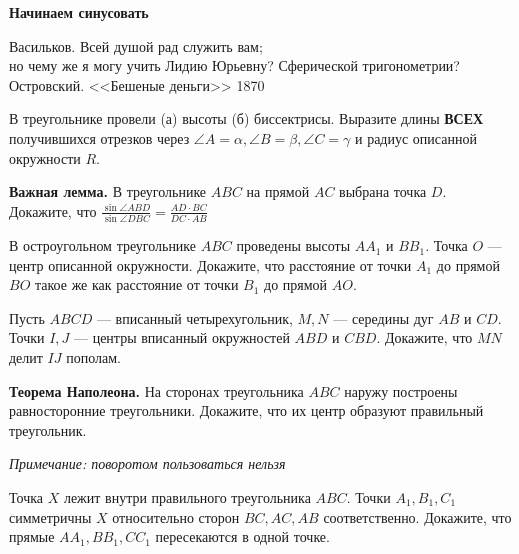 \centerline{\Huge \bf Начинаем синусовать}
\centerline{\Huge \bf }

\begin{flushright}
        \scriptsize{Васильков. Всей душой рад служить вам;\\ но чему же я могу учить Лидию Юрьевну? Сферической тригонометрии?\\Островский. <<Бешеные деньги>> 1870}
\end{flushright}


 В треугольнике провели (а) высоты (б) биссектрисы. Выразите длины \textbf{ВСЕХ} получившихся отрезков через $\angle A = \alpha, \angle B = \beta, \angle C = \gamma$ и радиус описанной окружности $R$.

 \textbf{Важная лемма.} В треугольнике $ABC$ на прямой $AC$ выбрана точка $D$. Докажите, что $\frac{\sin\angle ABD}{\sin \angle DBC} = \frac{AD \cdot BC}{DC \cdot AB}$

В остроугольном треугольнике $ABC$ проведены высоты $AA_1$ и $BB_1$. Точка $O$ --- центр описанной окружности. Докажите, что расстояние от точки $A_1$ до прямой $BO$ такое же как расстояние от точки $B_1$ до прямой $AO$.

Пусть $ABCD$ --- вписанный четырехугольник, $M, N$ --- середины дуг $AB$ и $CD$. Точки $I, J$ --- центры вписанный окружностей $ABD$ и $CBD$. Докажите, что $MN$ делит $IJ$ пополам.

\textbf{Теорема Наполеона.} На сторонах треугольника $ABC$ наружу построены равносторонние треугольники. Докажите, что их центр образуют правильный треугольник. 


\begin{flushright}
	\textit{Примечание: поворотом пользоваться нельзя}	
\end{flushright}

Точка $X$ лежит внутри правильного треугольника $ABC$. Точки $A_1, B_1, C_1$ симметричны $X$ относительно сторон $BC, AC, AB$ соответственно. Докажите, что прямые $AA_1, BB_1, CC_1$ пересекаются в одной точке.

